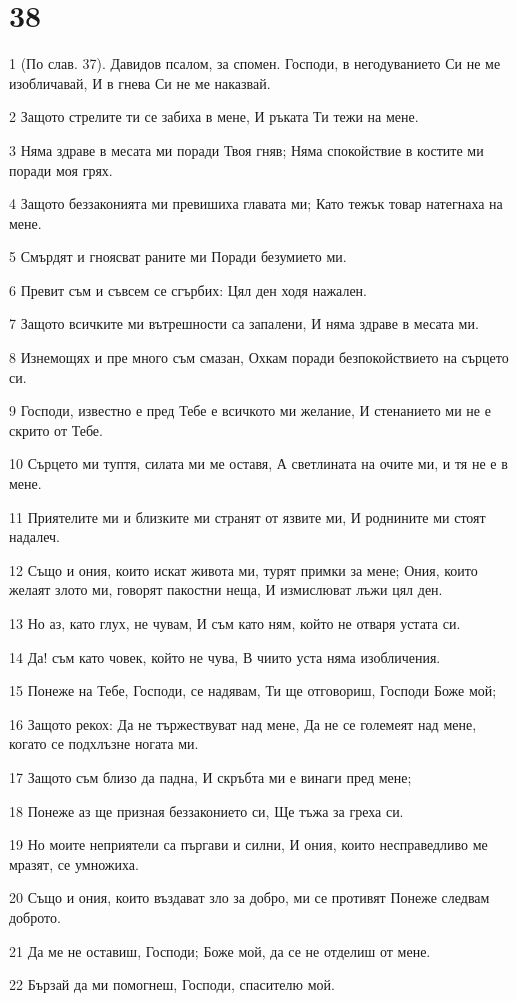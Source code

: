 \chapter{38}

\par 1 (По слав. 37). Давидов псалом, за спомен. Господи, в негодуванието Си не ме изобличавай, И в гнева Си не ме наказвай.
\par 2 Защото стрелите ти се забиха в мене, И ръката Ти тежи на мене.
\par 3 Няма здраве в месата ми поради Твоя гняв; Няма спокойствие в костите ми поради моя грях.
\par 4 Защото беззаконията ми превишиха главата ми; Като тежък товар натегнаха на мене.
\par 5 Смърдят и гноясват раните ми Поради безумието ми.
\par 6 Превит съм и съвсем се сгърбих: Цял ден ходя нажален.
\par 7 Защото всичките ми вътрешности са запалени, И няма здраве в месата ми.
\par 8 Изнемощях и пре много съм смазан, Охкам поради безпокойствието на сърцето си.
\par 9 Господи, известно е пред Тебе е всичкото ми желание, И стенанието ми не е скрито от Тебе.
\par 10 Сърцето ми туптя, силата ми ме оставя, А светлината на очите ми, и тя не е в мене.
\par 11 Приятелите ми и близките ми странят от язвите ми, И роднините ми стоят надалеч.
\par 12 Също и ония, които искат живота ми, турят примки за мене; Ония, които желаят злото ми, говорят пакостни неща, И измислюват лъжи цял ден.
\par 13 Но аз, като глух, не чувам, И съм като ням, който не отваря устата си.
\par 14 Да! съм като човек, който не чува, В чиито уста няма изобличения.
\par 15 Понеже на Тебе, Господи, се надявам, Ти ще отговориш, Господи Боже мой;
\par 16 Защото рекох: Да не тържествуват над мене, Да не се големеят над мене, когато се подхлъзне ногата ми.
\par 17 Защото съм близо да падна, И скръбта ми е винаги пред мене;
\par 18 Понеже аз ще призная беззаконието си, Ще тъжа за греха си.
\par 19 Но моите неприятели са пъргави и силни, И ония, които несправедливо ме мразят, се умножиха.
\par 20 Също и ония, които въздават зло за добро, ми се противят Понеже следвам доброто.
\par 21 Да ме не оставиш, Господи; Боже мой, да се не отделиш от мене.
\par 22 Бързай да ми помогнеш, Господи, спасителю мой.

